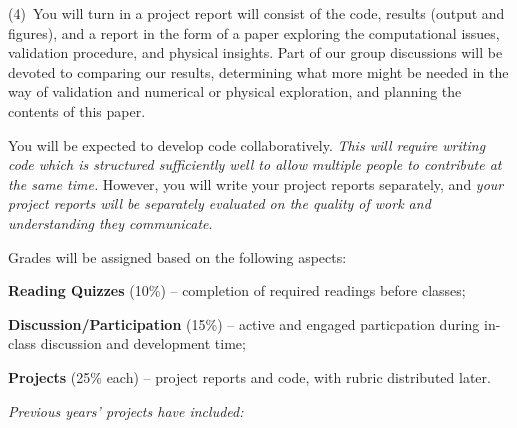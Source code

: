 \documentclass[12pt]{mcplain}
\begin{document}
\begin{leftindent}
  (4)~You will turn in a  project report will consist of the code, results
  (output and figures), and a report in the form of a paper exploring the
  computational issues, validation procedure, and physical insights. Part of our
  group discussions will be devoted to comparing our results, determining what
  more might be needed in the way of validation and numerical or physical
  exploration, and planning the contents of this paper.

  You will be expected to develop code collaboratively. \textit{This will
  require writing code which is structured sufficiently well to allow multiple
  people to contribute at the same time.} However, you will write your project
  reports separately, and \textit{your project reports will be separately
  evaluated on the quality of work and understanding they communicate}.

  \end{leftindent}


Grades will be assigned based on the following aspects:

\begin{leftindentlist*}{\baselineskip}

 \item \textbf{Reading Quizzes} (10\%) -- completion of required readings before
 classes;

 \item \textbf{Discussion/Participation} (15\%) -- active and engaged
 particpation during in-class discussion and development time;

 \item \textbf{Projects} (25\% each) -- project reports and code, with rubric
 distributed later.

\end{leftindentlist*}



\textit{Previous years' projects have included:}
\end{document}
